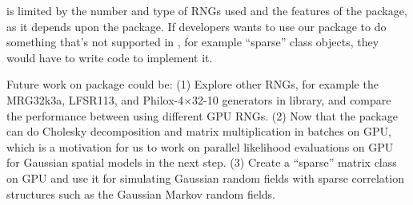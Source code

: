 \documentclass[article,nojss]{jss}\usepackage[]{graphicx}\usepackage[]{color}
\begin{document}

 is limited by the number and type of  RNGs used and the features of the  package, as it depends upon the  package. If developers wants to use our package to do something that's not supported in , for example ``sparse'' class objects, they would have to write  code to implement it.

Future work on  package could be: (1) Explore other RNGs, for example the MRG32k3a, LFSR113, and Philox-4×32-10 generators in  library, and compare the  performance between using different GPU RNGs. (2) Now that the package can do Cholesky decomposition and matrix multiplication in batches on GPU, which is a motivation for us to work on parallel likelihood evaluations on GPU for Gaussian spatial models in the next step. (3) Create a ``sparse'' matrix class on GPU and use it for simulating Gaussian random fields with sparse correlation structures such as the Gaussian Markov random fields.










\newpage












\begin{appendix}

\end{appendix}
\end{document}
